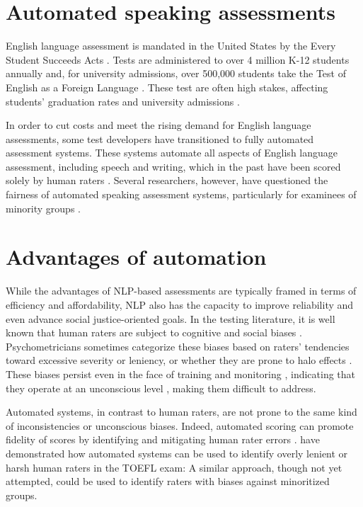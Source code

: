 \documentclass [PhD] {uclathes}
\begin{document}
\section{Automated speaking assessments}

English language assessment is mandated in the United States by the Every Student Succeeds Acts \citep{essa2015}. Tests are administered to over 4 million K-12 students annually \citep{irwin2021report} and, for university admissions, over 500,000 students take the Test of English as a Foreign Language \citep[TOEFL;][]{ets2005}. These test are often high stakes, affecting students' graduation rates and university admissions \citep{cimpian2017}.

In order to cut costs and meet the rising demand for English language assessments, some test developers have transitioned to fully automated assessment systems. These systems automate all aspects of English language assessment, including speech and writing, which in the past have been scored solely by human raters \citep{evanini2017approaches}. Several researchers, however, have questioned the fairness of automated speaking assessment systems, particularly for examinees of minority groups \citep{wang2018monitoring, collier2020test}.

\section{Advantages of automation}

While the advantages of NLP-based assessments are typically framed in terms of efficiency and affordability, NLP also has the capacity to improve reliability and even advance social justice-oriented goals. In the testing literature, it is well known that human raters are subject to cognitive and social biases \citep{engelhard2002monitoring}. Psychometricians sometimes categorize these biases based on raters' tendencies toward excessive severity or leniency, or whether they are prone to halo effects \citep{saal1980}. These biases persist even in the face of training and monitoring \citep{engelhard1994examining}, indicating that they operate at an unconscious level \citep{spencer2016}, making them difficult to address.

Automated systems, in contrast to human raters, are not prone to the same kind of inconsistencies or unconscious biases. Indeed, automated scoring can promote fidelity of scores by identifying and mitigating human rater errors \citep{bejar2011validity}. \citet{wang2018monitoring} have demonstrated how automated systems can be used to identify overly lenient or harsh human raters in the TOEFL exam: A similar approach, though not yet attempted, could be used to identify raters with biases against minoritized groups.
\end{document}
